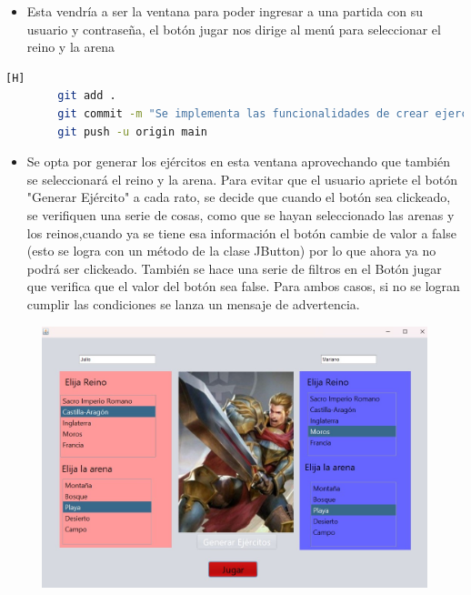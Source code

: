 \documentclass{article}
\begin{document}
\begin{itemize}	
	\item Esta vendría a ser la ventana para poder ingresar a una partida con su usuario y contraseña, el botón jugar nos dirige al menú para seleccionar el reino y la arena
\end{itemize}

	
	
	
	

	\begin{lstlisting}[language=bash,caption={Commit: 2f725690a798849fc409e205c4096bf66af3cc1d }][H]
		git add .
		git commit -m "Se implementa las funcionalidades de crear ejercito y seleccionar arena en la clase QuickGameWindows"			
		git push -u origin main
	\end{lstlisting}
	
	
	\begin{itemize}
	\item Se opta por generar los ejércitos en esta ventana aprovechando que también se seleccionará el reino y la arena. Para evitar que el usuario apriete el botón "Generar Ejército" a cada rato, se decide que cuando el botón sea clickeado, se verifiquen una serie de cosas, como que se hayan seleccionado las arenas y los reinos,cuando ya se tiene esa información el botón cambie de valor a false (esto se logra con un método de la clase JButton) por lo que ahora ya no podrá ser clickeado. También se hace una serie de filtros en el Botón jugar que verifica que el valor del botón sea false. Para ambos casos, si no se logran cumplir las condiciones se lanza un mensaje de advertencia.
	\end{itemize}


		\begin{figure}[H]
		\centering
		\includegraphics[width=1\textwidth,keepaspectratio]{img/optionsGame.jpg}
	\end{figure}
	
\end{document}
